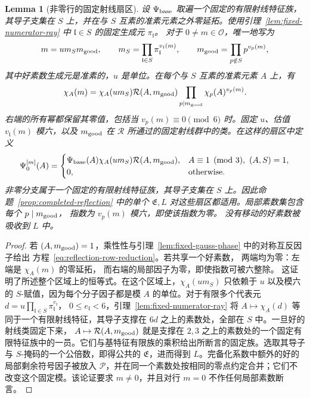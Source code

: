 \documentclass[11pt,a4paper]{article}
\numberwithin{equation}{section}
\numberwithin{figure}{section}
\newtheorem{lemma}[theorem]{Lemma}
\theoremstyle{definition}
\theoremstyle{remark}
\begin{document}
\begin{lemma}[非零行的固定射线扇区]
\label{lem:reflection-row-sectors}
设 $\Psi_{\rm base}$ 取遍一个固定的有限射线特征族，其导子支集在 $S$ 上，并在与 $S$ 互素的准素元素之外零延拓。使用引理~\ref{lem:fixed-numerator-ray} 中 $\mathfrak l\in S$ 的固定生成元 $\pi_{\mathfrak l}$。
对于 $0\ne m\in\mathcal O$，唯一地写为
\[
 m=u m_Sm_{\rm good},\qquad
 m_S=\prod_{\mathfrak l\in S}\pi_{\mathfrak l}^{v_{\mathfrak l}(m)},\qquad
 m_{\rm good}=\prod_{p\notin S}p^{v_p(m)},
\]
其中好素数生成元是准素的，$u$ 是单位。在每个与 $S$ 互素的准素元素 $A$ 上，有
\begin{equation}\label{eq:reflection-row-reduction}
 \chi_A(m)=\chi_A(u m_S)\mathcal R(A,m_{\rm good})
       \prod_{p\mid m_{\rm good}}\chi_p(A)^{v_p(m)}.
\end{equation}
右端的所有幂都保留其零值，包括当
$v_p(m)\equiv0\pmod6$ 时。固定 $u$、估值 $v_{\mathfrak l}(m)$ 模六，以及 $m_{\rm good}$ 在 $\mathcal R$ 所通过的固定射线群中的类。在这样的扇区中定义
\begin{equation}\label{eq:reflection-sector-character}
 \Psi_0^{[m]}(A)=
 \begin{cases}
 \Psi_{\rm base}(A)\chi_A(u m_S)\mathcal R(A,m_{\rm good}),
       &A\equiv1\pmod3,\ (A,S)=1,\\
 0,&\text{otherwise}.
 \end{cases}
\end{equation}
非零分支属于一个固定的有限射线特征族，其导子支集在 $S$ 上。因此命题~\ref{prop:completed-reflection} 中的单个
$\mathfrak E,L$ 对这些扇区都适用。局部素数集包含每个 $p\mid m_{\rm good}$，
指数为 $v_p(m)$ 模六，即使该指数为零。
没有移动的好素数被吸收到 $L$ 中。
\end{lemma}

\begin{proof}
若 $(A,m_{\rm good})=1$，乘性性与引理~\ref{lem:fixed-gauss-phase} 中的对称互反因子给出
方程~\eqref{eq:reflection-row-reduction}。若共享一个好素数，
两端均为零：左端是 $\chi_A(m)$ 的零延拓，
而右端的局部因子为零，即使指数可被六整除。
这证明了所述整个区域上的恒等式。在这个区域上，$\chi_A(u m_S)$ 只依赖于 $u$ 以及模六的 $S$-赋值，因为每个分子因子都是模 $A$ 的单位。对于有限多个代表元
$d=u\prod_{\mathfrak l\in S}\pi_{\mathfrak l}^{e_{\mathfrak l}}$，
$0\le e_{\mathfrak l}<6$，引理~\ref{lem:fixed-numerator-ray} 将
$A\mapsto\chi_A(d)$ 等同于一个有限射线特征，其导子支撑在 $6d$ 之上的素数处，全部在 $S$ 中。一旦好的射线类固定下来，
$A\mapsto\mathcal R(A,m_{\rm good})$ 就是支撑在 $2,3$ 之上的素数处的一个固定有限特征族中的一员。它们与基特征有限族的乘积给出所断言的固定族。选取其导子与 $S$-掩码的一个公倍数，即得公共的
$\mathfrak E$，进而得到 $L$。完备化系数中额外的好的局部剩余符号因子被放入 $\mathcal P$，并在同一个素数处按相同的零点约定合并；它们不改变这个固定模。该论证要求 $m\ne0$，并且对行
$m=0$ 不作任何局部素数断言。
\end{proof}
\end{document}
